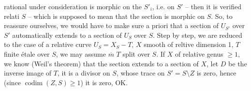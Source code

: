 rational under consideration is morphic on
the $S'_i$, i.e. on $S'$ -- then it is
verified relati  $S$ -- which
is supposed to mean that the section is
morphic on $S$. So, to
reassure ourselves, we would have to make sure a
priori that a section of $U_{S'}$ over $S'$
automatically extends to 
a section of $U_S$ over $S$. Step by
step, we are reduced to the case
of a relative curve $U_S=X_S-T$,
$X$ smooth  of reltive dimension 1, $T$ finite étale
over $S$,  we may assume $\overline m$ $T$ split over $S$.
If $X$ of relative genus $\geq 1$, we know
(Weil's theorem) that the section extends
to a section of $X$, let $D$ be the inverse
image of $T$, it is a divisor on $S$,
whose trace on $S'=S\setminus Z$ is zero, hence
(since $\operatorname{codim}(Z,S)\geq 1$) it is zero, OK.
